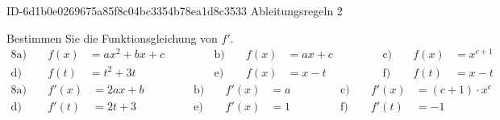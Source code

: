 \begin{exercise}
      {ID-6d1b0e0269675a85f8c04bc3354b78ea1d8c3533}
      {Ableitungsregeln 2}
  \ifproblem\problem\par
    Bestimmen Sie die Funktionsgleichung von $f'$.
    \begin{alignat*}{8}
        \text{a)}&\; & f(x)&=ax^2+bx+c
      & \quad&\quad
      & \text{b)}&\; & f(x)&=ax+c
      & \quad&\quad
      & \text{c)}&\; & f(x)&=x^{c+1}
      \\
        \text{d)}&\; & f(t)&=t^2+3t
      & \quad&\quad
      & \text{e)}&\; & f(x)&=x-t
      & \quad&\quad
      & \text{f)}&\; & f(t)&=x-t
    \end{alignat*}
  \fi
  \ifoutcome\outcome
    \begin{alignat*}{8}
        \text{a)}&\; & f'(x)&=2ax+b
      & \quad&\quad
      & \text{b)}&\; & f'(x)&=a
      & \quad&\quad
      & \text{c)}&\; & f'(x)&=(c+1)\cdot x^c
      \\
        \text{d)}&\; & f'(t)&=2t+3
      & \quad&\quad
      & \text{e)}&\; & f'(x)&=1
      & \quad&\quad
      & \text{f)}&\; & f'(t)&=-1
    \end{alignat*}
  \fi
\end{exercise}
